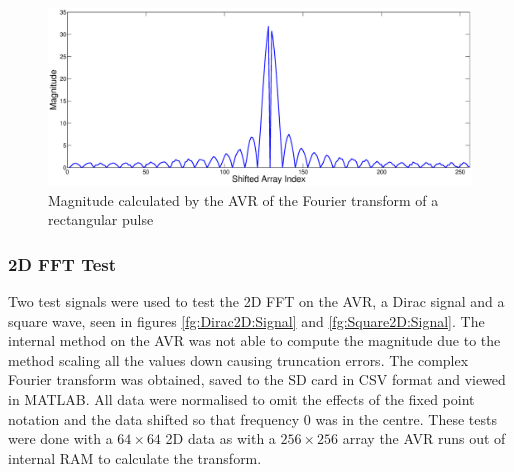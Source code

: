 \begin{figure}
\includegraphics[width=\textwidth]{./Figures/AVR_FFT_Square_Mag.eps}
\caption{Magnitude calculated by the AVR of the Fourier transform of a rectangular pulse}
\label{fig:AVR:FFT:Square:Mag}
\end{figure}

\subsubsection{2D FFT Test}

Two test signals were used to test the 2D FFT on the AVR, a Dirac signal and a square wave, seen in figures \ref{fg:Dirac2D:Signal} and \ref{fg:Square2D:Signal}. The internal method on the AVR was not able to compute the magnitude due to the method scaling all the values down causing truncation errors. The complex Fourier transform was obtained, saved to the SD card in CSV format and viewed in MATLAB. All data were normalised to omit the effects of the fixed point notation and the data shifted so that frequency 0 was in the centre. These tests were done with a $64\times64$ 2D data as with a $256 \times 256$ array the AVR runs out of internal RAM to calculate the transform. 

